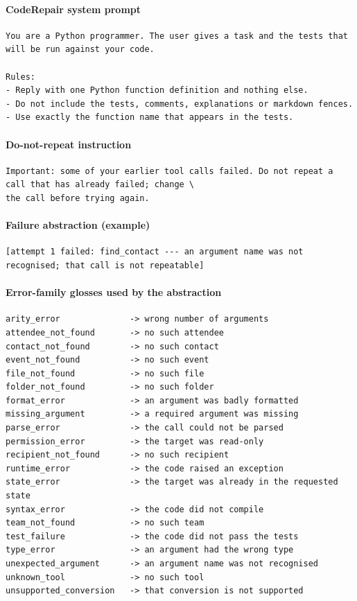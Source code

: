 \paragraph{CodeRepair system prompt}
{\verbfont\begin{verbatim}
You are a Python programmer. The user gives a task and the tests that will be run against your code.

Rules:
- Reply with one Python function definition and nothing else.
- Do not include the tests, comments, explanations or markdown fences.
- Use exactly the function name that appears in the tests.
\end{verbatim}}

\paragraph{Do-not-repeat instruction}
{\verbfont\begin{verbatim}
Important: some of your earlier tool calls failed. Do not repeat a call that has already failed; change \
the call before trying again.
\end{verbatim}}

\paragraph{Failure abstraction (example)}
{\verbfont\begin{verbatim}
[attempt 1 failed: find_contact --- an argument name was not recognised; that call is not repeatable]
\end{verbatim}}

\paragraph{Error-family glosses used by the abstraction}
{\verbfont\begin{verbatim}
arity_error              -> wrong number of arguments
attendee_not_found       -> no such attendee
contact_not_found        -> no such contact
event_not_found          -> no such event
file_not_found           -> no such file
folder_not_found         -> no such folder
format_error             -> an argument was badly formatted
missing_argument         -> a required argument was missing
parse_error              -> the call could not be parsed
permission_error         -> the target was read-only
recipient_not_found      -> no such recipient
runtime_error            -> the code raised an exception
state_error              -> the target was already in the requested state
syntax_error             -> the code did not compile
team_not_found           -> no such team
test_failure             -> the code did not pass the tests
type_error               -> an argument had the wrong type
unexpected_argument      -> an argument name was not recognised
unknown_tool             -> no such tool
unsupported_conversion   -> that conversion is not supported
\end{verbatim}}
